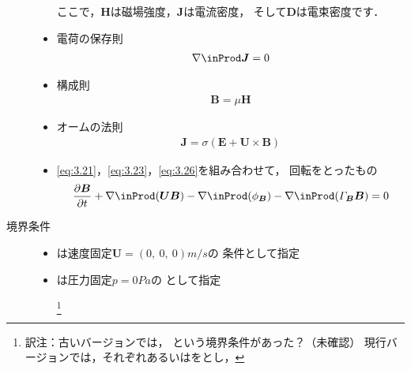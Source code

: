 \begin{description}
\begin{itemize}
                   ここで，$\bm{H}$は磁場強度，$\bm{J}$は電流密度，
                   そして$\bm{D}$は電束密度です．
             \item 電荷の保存則
                   \begin{align}
                    \label{eq:3.24}
                    \nabla \inProd \bm{J} = 0
                   \end{align}
             \item 構成則
                   \begin{align}
                    \label{eq:3.25}
                    \bm{B} = \mu\bm{H}
                   \end{align}
             \item オームの法則
                   \begin{align}
                    \label{eq:3.26}
                    \bm{J} = \sigma(\bm{E} + \bm{U} \times \bm{B})
                   \end{align}
             \item \autoref{eq:3.21}，\autoref{eq:3.23}，\autoref{eq:3.26}を組み合わせて，
                   回転をとったもの
                   \begin{align}
                    \label{eq:3.27}
                    \frac{\partial\bm{B}}{\partial t}
                    + \nabla \inProd (\bm{U}\bm{B})
                    - \nabla \inProd (\phi_{\bm{B}})
                    - \nabla \inProd (\varGamma_{\bm{B}}\bm{B}) = 0
                   \end{align}
            \end{itemize}
            \item[境界条件] \mbox{}
            \begin{itemize}
             \item {}は速度固定$\bm{U} = (0,\ 0,\ 0) \unit{m/s}$の
%
%
                   条件として指定%
\footnotemark
             \item {}は圧力固定$p = 0 \unit{Pa}$の
%
%
                   として指定
\addtocounter{footnote}{-1}
\footnote{訳注：古いバージョンでは，
という境界条件があった？（未確認）
現行バージョンでは，それぞれあるいはをとし，
}
\end{itemize}
\end{description}
